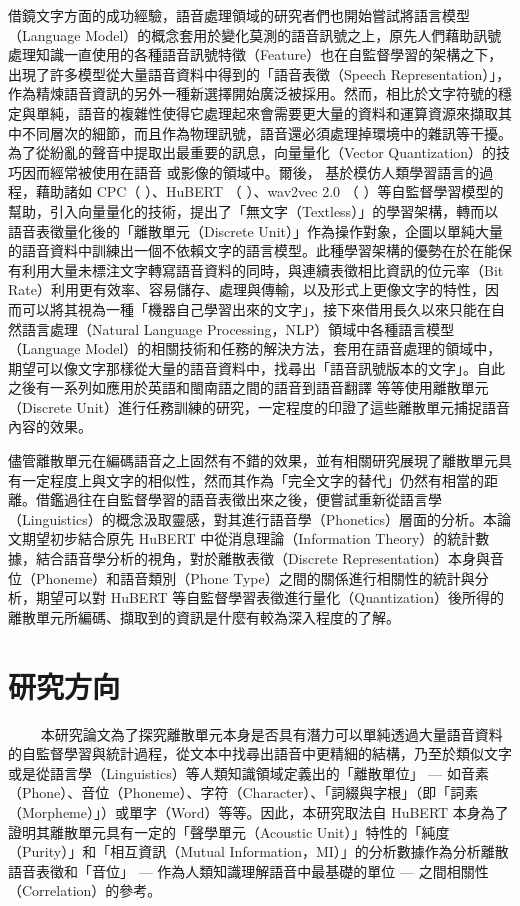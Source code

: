 借鏡文字方面的成功經驗，語音處理領域的研究者們也開始嘗試將語言模型（Language Model）的概念套用於變化莫測的語音訊號之上，原先人們藉助訊號處理知識一直使用的各種語音訊號特徵（Feature）也在自監督學習的架構之下，出現了許多模型從大量語音資料中得到的「語音表徵（Speech Representation）」，作為精煉語音資訊的另外一種新選擇開始廣泛被採用。然而，相比於文字符號的穩定與單純，語音的複雜性使得它處理起來會需要更大量的資料和運算資源來擷取其中不同層次的細節，而且作為物理訊號，語音還必須處理掉環境中的雜訊等干擾。為了從紛亂的聲音中提取出最重要的訊息，向量量化（Vector Quantization）的技巧因而經常被使用在語音 \cite{chorowski_unsupervised_2019,chen_vector_2023,zhao_speech_2023} 或影像的領域中。爾後， \cite{lakhotia_generative_2021-1}  基於模仿人類學習語言的過程，藉助諸如 CPC（\cite{oord_representation_2019} ）、HuBERT （\cite{hsu_hubert_2021} ）、wav2vec 2.0 （\cite{baevski_wav2vec_2020} ）等自監督學習模型的幫助，引入向量量化的技術，提出了「無文字（Textless）」的學習架構，轉而以語音表徵量化後的「離散單元（Discrete Unit）」作為操作對象，企圖以單純大量的語音資料中訓練出一個不依賴文字的語言模型。此種學習架構的優勢在於在能保有利用大量未標注文字轉寫語音資料的同時，與連續表徵相比資訊的位元率（Bit Rate）利用更有效率、容易儲存、處理與傳輸，以及形式上更像文字的特性，因而可以將其視為一種「機器自己學習出來的文字」，接下來借用長久以來只能在自然語言處理（Natural Language Processing，NLP）領域中各種語言模型（Language Model）的相關技術和任務的解決方法，套用在語音處理的領域中，期望可以像文字那樣從大量的語音資料中，找尋出「語音訊號版本的文字」。自此之後有一系列如應用於英語和閩南語之間的語音到語音翻譯 \cite{chen_speech--speech_2023} 等等使用離散單元（Discrete Unit）進行任務訓練的研究，一定程度的印證了這些離散單元捕捉語音內容的效果。

儘管離散單元在編碼語音之上固然有不錯的效果，並有相關研究展現了離散單元具有一定程度上與文字的相似性，然而其作為「完全文字的替代」仍然有相當的距離。借鑑過往在自監督學習的語音表徵出來之後，便嘗試重新從語言學（Linguistics）的概念汲取靈感，對其進行語音學（Phonetics）層面的分析。本論文期望初步結合原先 HuBERT 中從消息理論（Information Theory）的統計數據，結合語音學分析的視角，對於離散表徵（Discrete Representation）本身與音位（Phoneme）和語音類別（Phone Type）之間的關係進行相關性的統計與分析，期望可以對 HuBERT 等自監督學習表徵進行量化（Quantization）後所得的離散單元所編碼、擷取到的資訊是什麼有較為深入程度的了解。


    
\section{研究方向}
　　
本研究論文為了探究離散單元本身是否具有潛力可以單純透過大量語音資料的自監督學習與統計過程，從文本中找尋出語音中更精細的結構，乃至於類似文字或是從語言學（Linguistics）等人類知識領域定義出的「離散單位」 --- 如音素（Phone）、音位（Phoneme）、字符（Character）、「詞綴與字根」（即「詞素（Morpheme）」）或單字（Word）等等。因此，本研究取法自 HuBERT 本身為了證明其離散單元具有一定的「聲學單元（Acoustic Unit）」特性的「純度（Purity）」和「相互資訊（Mutual Information，MI）」的分析數據作為分析離散語音表徵和「音位」 --- 作為人類知識理解語音中最基礎的單位 --- 之間相關性（Correlation）的參考。

